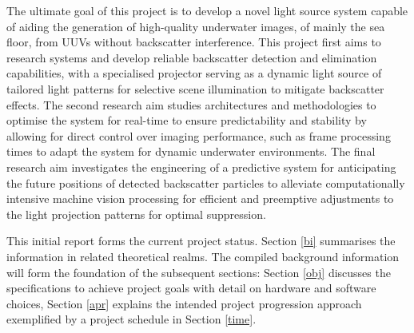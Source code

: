 The ultimate goal of this project is to develop a novel light source system capable of aiding the generation of high-quality underwater images, of mainly the sea floor, from UUVs without backscatter interference. This project first aims to research systems and develop reliable backscatter detection and elimination capabilities, with a specialised projector serving as a dynamic light source of tailored light patterns for selective scene illumination to mitigate backscatter effects. The second research aim studies architectures and methodologies to optimise the system for real-time to ensure predictability and stability by allowing for direct control over imaging performance, such as frame processing times to adapt the system for dynamic underwater environments. The final research aim investigates the engineering of a predictive system for anticipating the future positions of detected backscatter particles to alleviate computationally intensive machine vision processing for efficient and preemptive adjustments to the light projection patterns for optimal suppression.

This initial report forms the current project status. Section \ref{bi} summarises the information in related theoretical realms. The compiled background information will form the foundation of the subsequent sections: Section \ref{obj} discusses the specifications to achieve project goals with detail on hardware and software choices, Section \ref{apr} explains the intended project progression approach exemplified by a project schedule in Section \ref{time}.
